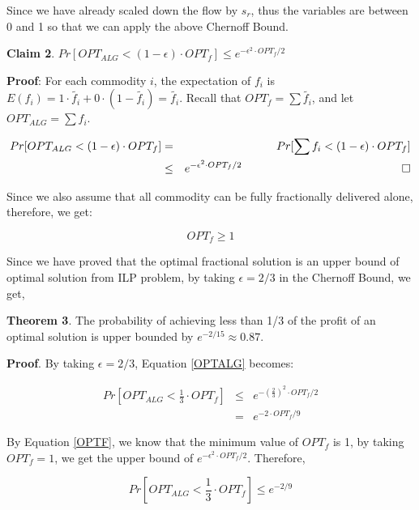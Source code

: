 \documentclass[onecolumn,11pt,journal, compsoc]{IEEEtran}
\newcommand*{\QEDB}{\hfill\ensuremath{\square}}%
\begin{document}
Since we have already scaled down the flow by $s_r$, thus the variables are between 0 and 1 so that we can apply the above Chernoff Bound.

\vspace*{0.15in}
\textbf{Claim 2}. $Pr[OPT_{ALG} < (1-\epsilon) \cdot OPT_f] \le e^{-\epsilon^2 \cdot OPT_f / 2}$ 
\vspace*{0.15in}

\textbf{Proof}: For each commodity $i$, the expectation of $f_i$ is $E(f_i) = 1 \cdot \tilde{f_i} + 0 \cdot (1-\tilde{f_i}) = \tilde{f_i}$. Recall that $OPT_f = \sum{\tilde{f_i}} $, and let $OPT_{ALG} = \sum{f_i}$.

\begin{eqnarray} \label{OPTALG}
Pr[OPT_{ALG}  < (1-\epsilon) \cdot OPT_f] &=& Pr[\sum{f_i} < (1-\epsilon) \cdot OPT_f] \\ \nonumber
&\le& e^{-\epsilon^2 \cdot OPT_f / 2}  \,\,\,\,\,\,\,\,\,\,\,\,\,\,\,\,\,\,\,\,\,\,\,\,\,\,\,\,\,\,\,\,\,\,\,\,\,\,\,\,\,\,\,\,\,\,\,\,\,\,\,\,\,\,\,\,\,\,\,\,\,\,\,\,\,\,\,\,\,\,\,\,\,\,\,\,\,\,\,\,\,\,\,\,\,\QEDB \nonumber
\end{eqnarray}

 Since we also assume that all commodity can be fully fractionally delivered alone, therefore, we get:

\begin{equation} \label{OPTF}
	OPT_{f} \ge 1
\end{equation}

Since we have proved that the optimal fractional solution is an upper bound of optimal solution from ILP problem, by taking $\epsilon = 2/3$ in the Chernoff Bound, we get, 

\textbf{Theorem 3}. The probability of achieving less than 1/3 of the profit of an optimal solution is upper bounded by $e^{-2/15} \approx 0.87$.

\textbf{Proof}.
By taking $\epsilon = 2/3$, Equation \ref{OPTALG} becomes:

\begin{eqnarray}
	Pr[OPT_{ALG}  < \frac{1}{3} \cdot OPT_f] &\le& e^{-(\frac{2}{3})^2 \cdot OPT_f / 2} \\
	&=& e^{-2 \cdot OPT_f/9}
\end{eqnarray}

By Equation \ref{OPTF}, we know that the minimum value of $OPT_f$ is 1, by taking $OPT_f = 1$, we get the upper bound of $e^{-\epsilon^2 \cdot OPT_f / 2}$. Therefore,

\begin{equation}
Pr[OPT_{ALG}  < \frac{1}{3} \cdot OPT_f] \le e^{-2/9}
\end{equation}
\end{document}
